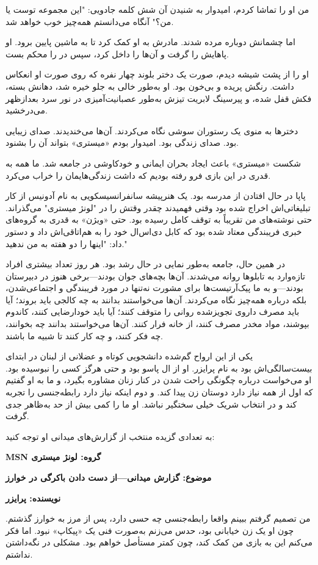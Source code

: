 من او را تماشا کردم، امیدوار به شنیدن آن شش کلمه جادویی: "این مجموعه توست یا من؟" آنگاه می‌دانستم همه‌چیز خوب خواهد شد.

اما چشمانش دوباره مرده شدند. مادرش به او کمک کرد تا به ماشین پایین برود. او پاهایش را گرفت و آن‌ها را داخل کرد، سپس در را محکم بست.

او را از پشت شیشه دیدم، صورت یک دختر بلوند چهار نفره که روی صورت او انعکاس داشت. رنگش پریده و بی‌خون بود. او به‌طور خالی به جلو خیره شد، دهانش بسته، فکش قفل شده، و پیرسینگ لابریت تیزش به‌طور عصبانیت‌آمیزی در نور سرد بعدازظهر می‌درخشید.

دختر‌ها به منوی یک رستوران سوشی نگاه می‌کردند. آن‌ها می‌خندیدند. صدای زیبایی بود. صدای زندگی بود. امیدوار بودم «میستری» بتواند آن را بشنود.

شکست «میستری» باعث ایجاد بحران ایمانی و خودکاوشی در جامعه شد. ما همه به قدری در این بازی فرو رفته بودیم که داشت زندگی‌هایمان را خراب می‌کرد.

پاپا در حال افتادن از مدرسه بود. یک هنرپیشه سانفرانسیسکویی به نام آدونیس از کار تبلیغاتی‌اش اخراج شده بود وقتی فهمیدند چقدر وقتش را در "لونژ میستری" می‌گذراند. حتی نوشته‌های من تقریباً به توقف کامل رسیده بود. حتی «ویژن» به قدری به گروه‌های خبری فریبندگی معتاد شده بود که کابل دی‌اس‌ال خود را به هم‌اتاقی‌اش داد و دستور داد: "اینها را دو هفته به من ندهید."

در همین حال، جامعه به‌طور نمایی در حال رشد بود. هر روز تعداد بیشتری افراد تازه‌وارد به تابلوها روانه می‌شدند. آن‌ها بچه‌های جوان بودند—برخی هنوز در دبیرستان بودند—و به ما پیک‌آرتیست‌ها برای مشورت نه‌تنها در مورد فریبندگی و اجتماعی‌شدن، بلکه درباره همه‌چیز نگاه می‌کردند. آن‌ها می‌خواستند بدانند به چه کالجی باید بروند؛ آیا باید مصرف داروی تجویزشده روانی را متوقف کنند؛ آیا باید خودارضایی کنند، کاندوم بپوشند، مواد مخدر مصرف کنند، از خانه فرار کنند. آن‌ها می‌خواستند بدانند چه بخوانند، چه فکر کنند، و چه کار کنند تا شبیه ما باشند.

یکی از این ارواح گم‌شده دانشجویی کوتاه و عضلانی از لبنان در ابتدای بیست‌سالگی‌اش بود به نام پرایزر. او از ال پاسو بود و حتی هرگز کسی را نبوسیده بود. او می‌خواست درباره چگونگی راحت شدن در کنار زنان مشاوره بگیرد، و ما به او گفتیم که اول از همه نیاز دارد دوستان زن پیدا کند. و دوم اینکه نیاز دارد رابطه‌جنسی را تجربه کند و در انتخاب شریک خیلی سختگیر نباشد. او ما را کمی بیش از حد به‌ظاهر جدی گرفت.

به تعدادی گزیده منتخب از گزارش‌های میدانی او توجه کنید:

\textbf{MSN گروه: لونژ میستری}

\textbf{موضوع: گزارش میدانی—از دست دادن باکرگی در خوارز}

\textbf{نویسنده: پرایزر}

من تصمیم گرفتم ببینم واقعا رابطه‌جنسی چه حسی دارد، پس از مرز به خوارز گذشتم. چون او یک زن خیابانی بود، حدس می‌زنم به‌صورت فنی یک «پیکاپ» نبود. اما فکر می‌کنم این به بازی من کمک کند، چون کمتر مستأصل خواهم بود. مشکلی در نگه‌داشتن نداشتم.
